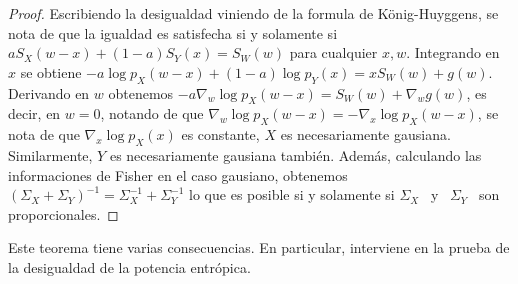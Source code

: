 \begin{proof}
  Escribiendo la desigualdad viniendo de la formula de K\"onig-Huyggens, se nota
  de que  la igualdad es  satisfecha si y  solamente si $a S_X(w-x)  + (1-a)
  S_Y(x) =  S_W(w)$ para cualquier  $x, w$. Integrando  en $x$ se  obtiene $-a
  \log  p_X(w-x) + (1-a)  \log p_Y(x)  = x  S_W(w) +  g(w)$. Derivando  en $w$
  obtenemos $-a \nabla_w \log p_X(w-x) = S_W(w) + \nabla_w g(w)$, es decir, en
  $w = 0$, notando de que $\nabla_w \log p_X(w-x) = -\nabla_x \log p_X(w-x)$, se
  nota de  que $\nabla_x  \log p_X(x)$ es  constante, \ie $X$  es necesariamente
  gausiana.  Similarmente, $Y$ es  necesariamente gausiana  tambi\'en. Adem\'as,
  calculando las informaciones de Fisher  en el caso gausiano, obtenemos $\left(
    \Sigma_X + \Sigma_Y \right)^{-1} =  \Sigma_X^{-1} + \Sigma_Y^{-1}$ lo que es
  posible si y solamente si $\Sigma_X$ \ y \ $\Sigma_Y$ \ son proporcionales.
\end{proof}
%
Este teorema tiene varias consecuencias.  En particular, interviene en la prueba
de la desigualdad de la potencia entr\'opica.

\

